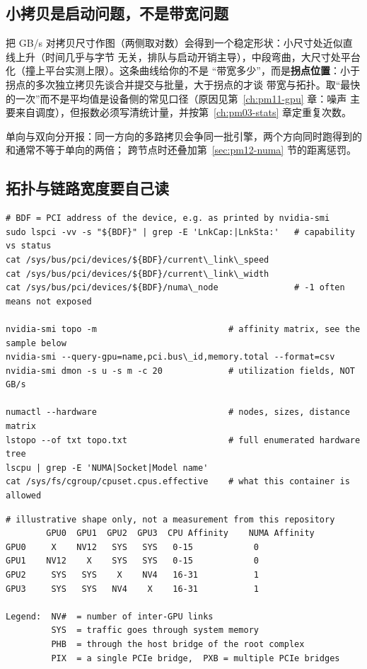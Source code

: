 \documentclass[12pt,a4paper,fontset=fandol]{ctexbook}
\begin{document}
\subsection*{小拷贝是启动问题，不是带宽问题}
把 GB/s 对拷贝尺寸作图（两侧取对数）会得到一个稳定形状：小尺寸处近似直线上升（时间几乎与字节
无关，排队与启动开销主导），中段弯曲，大尺寸处平台化（撞上平台实测上限）。这条曲线给你的不是
``带宽多少''，而是\textbf{拐点位置}：小于拐点的多次独立拷贝先谈合并提交与批量，大于拐点的才谈
带宽与拓扑。取``最快的一次''而不是平均值是设备侧的常见口径（原因见第~\ref{ch:pm11-gpu} 章：噪声
主要来自调度），但报数必须写清统计量，并按第~\ref{ch:pm03-stats} 章定重复次数。

单向与双向分开报：同一方向的多路拷贝会争同一批引擎，两个方向同时跑得到的和通常不等于单向的两倍；
跨节点时还叠加第~\ref{sec:pm12-numa} 节的距离惩罚。

\subsection*{拓扑与链路宽度要自己读}
\begin{lstlisting}[style=shellstyle,caption={搬运路径的拓扑确认：链路协商值、设备亲和性、节点距离与容器实际可用节点},label={lst:pm12-topo}]
# BDF = PCI address of the device, e.g. as printed by nvidia-smi
sudo lspci -vv -s "${BDF}" | grep -E 'LnkCap:|LnkSta:'   # capability vs status
cat /sys/bus/pci/devices/${BDF}/current\_link\_speed
cat /sys/bus/pci/devices/${BDF}/current\_link\_width
cat /sys/bus/pci/devices/${BDF}/numa\_node               # -1 often means not exposed

nvidia-smi topo -m                          # affinity matrix, see the sample below
nvidia-smi --query-gpu=name,pci.bus\_id,memory.total --format=csv
nvidia-smi dmon -s u -s m -c 20             # utilization fields, NOT GB/s

numactl --hardware                          # nodes, sizes, distance matrix
lstopo --of txt topo.txt                    # full enumerated hardware tree
lscpu | grep -E 'NUMA|Socket|Model name'
cat /sys/fs/cgroup/cpuset.cpus.effective    # what this container is allowed
\end{lstlisting}

\begin{lstlisting}[style=outstyle,caption={示意输出（格式示例，非本仓库实测值）：设备亲和性矩阵的形状与字段读法},label={lst:pm12-out-topo}]
# illustrative shape only, not a measurement from this repository
        GPU0  GPU1  GPU2  GPU3  CPU Affinity    NUMA Affinity
GPU0     X    NV12   SYS   SYS   0-15            0
GPU1    NV12    X    SYS   SYS   0-15            0
GPU2     SYS   SYS    X    NV4   16-31           1
GPU3     SYS   SYS   NV4    X    16-31           1

Legend:  NV#  = number of inter-GPU links
         SYS  = traffic goes through system memory
         PHB  = through the host bridge of the root complex
         PIX  = a single PCIe bridge,  PXB = multiple PCIe bridges
\end{lstlisting}
\end{document}
